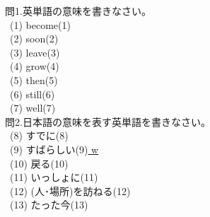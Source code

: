 \documentclass[uplatex]{jsarticle}
\title{\vspace{-30mm}\flushleft{\huge{第5回\ (\ \ 月\ \ 日)\ Unit11〜13}}}
\author{\Large{\hspace{90mm}名前\hspace{40mm}得点\hspace{20mm}点}}
\date{\empty}
\begin{document}
\maketitle
\vspace{-10mm}
\Large 問1.英単語の意味を書きなさい。\\
\large\ (1) become\hspace{\fill}(1)\underline{\hspace{35mm}}\\
\ (2) soon\hspace{\fill}(2)\underline{\hspace{35mm}}\\
\ (3) leave\hspace{\fill}(3)\underline{\hspace{35mm}}\\
\ (4) grow\hspace{\fill}(4)\underline{\hspace{35mm}}\\
\ (5) then\hspace{\fill}(5)\underline{\hspace{35mm}}\\
\ (6) still\hspace{\fill}(6)\underline{\hspace{35mm}}\\
\ (7) well\hspace{\fill}(7)\underline{\hspace{35mm}}\\
\Large 問2.日本語の意味を表す英単語を書きなさい。\\
\large\ (8) すでに\hspace{\fill}(8)\underline{\hspace{35mm}}\\
\ (9) すばらしい\hspace{\fill}(9)\underline{ w\hspace{30.5mm}}\\
\ (10) 戻る\hspace{\fill}(10)\underline{\hspace{35mm}}\\
\ (11) いっしょに\hspace{\fill}(11)\underline{\hspace{35mm}}\\
\ (12) (人･場所)を訪ねる\hspace{\fill}(12)\underline{\hspace{35mm}}\\
\ (13) たった今\hspace{\fill}(13)\underline{\hspace{35mm}}\\
\end{document}
